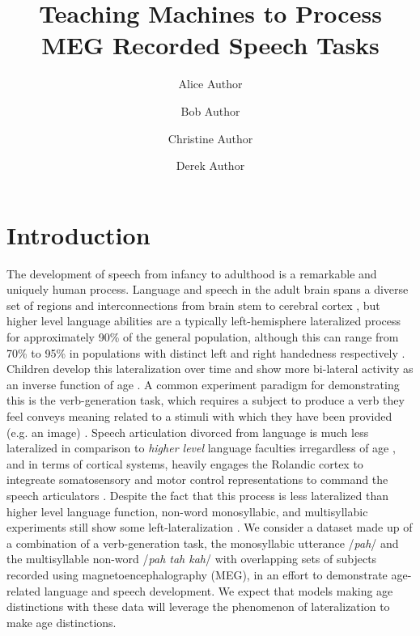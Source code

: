 \documentclass[fleqn,10pt]{wlscirep}
\title{Teaching Machines to Process MEG Recorded Speech Tasks}
\author[1,*]{Alice Author}
\author[2]{Bob Author}
\author[1,2,+]{Christine Author}
\author[2,+]{Derek Author}
\affil[1]{Affiliation, department, city, postcode, country}
\affil[2]{Affiliation, department, city, postcode, country}
\affil[*]{corresponding.author@email.example}
\affil[+]{these authors contributed equally to this work}
\begin{document}
\flushbottom
\maketitle
%
%
\thispagestyle{empty}

\section*{Introduction}

The development of speech from infancy to adulthood is a remarkable and uniquely human process. Language and speech in the adult brain spans a diverse set of regions and interconnections from brain stem to cerebral cortex \cite{GuentherBook, Tourville2011, Hillis}, but higher level language abilities are a typically left-hemisphere lateralized process for approximately 90\% of the general population, although this  can range from 70\% to 95\% in populations with distinct left and right handedness respectively \cite{GuentherBook, Kadis2011, Yu2014}. Children develop this lateralization over time and show more bi-lateral activity as an inverse function of age \cite{Kadis2011, Ressel2008}. A common experiment paradigm for demonstrating this is the verb-generation task, which requires a subject to produce a verb they feel conveys meaning related to a stimuli with which they have been provided (e.g. an image) \cite{Kadis2011}. Speech articulation divorced from language is much less lateralized in comparison to {\em higher level} language faculties irregardless of age \cite{GuentherBook}, and in terms of cortical systems, heavily engages the Rolandic cortex to integreate somatosensory and motor control representations to command the speech articulators \cite{GuentherBook}. Despite the fact that this process is less lateralized than higher level language function, non-word monosyllabic, and multisyllabic experiments still show some left-lateralization \cite{Ghosh2008a}. We consider a dataset made up of a combination of a verb-generation task, the monosyllabic utterance /{\em pah}/ and the multisyllable non-word /{\em pah tah kah}/ with overlapping sets of subjects recorded using magnetoencephalography (MEG), in an effort to demonstrate age-related language and speech development. We expect that models making age distinctions with these data will leverage the phenomenon of lateralization to make age distinctions.
\end{document}
